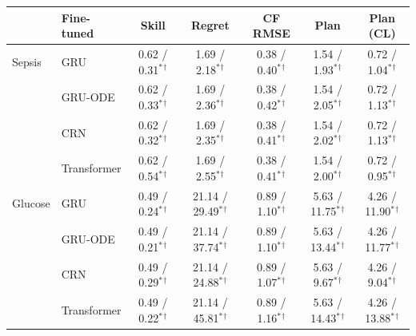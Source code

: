 \begin{tabular}{llccccc}
\toprule
 & Fine-tuned & Skill & Regret & CF RMSE & Plan & Plan (CL) \\
\midrule
Sepsis & GRU & 0.62 / 0.31$^{*}$$^{\dagger}$ & 1.69 / 2.18$^{*}$$^{\dagger}$ & 0.38 / 0.40$^{*}$$^{\dagger}$ & 1.54 / 1.93$^{*}$$^{\dagger}$ & 0.72 / 1.04$^{*}$$^{\dagger}$ \\
 & GRU-ODE & 0.62 / 0.33$^{*}$$^{\dagger}$ & 1.69 / 2.36$^{*}$$^{\dagger}$ & 0.38 / 0.42$^{*}$$^{\dagger}$ & 1.54 / 2.05$^{*}$$^{\dagger}$ & 0.72 / 1.13$^{*}$$^{\dagger}$ \\
 & CRN & 0.62 / 0.32$^{*}$$^{\dagger}$ & 1.69 / 2.35$^{*}$$^{\dagger}$ & 0.38 / 0.41$^{*}$$^{\dagger}$ & 1.54 / 2.02$^{*}$$^{\dagger}$ & 0.72 / 1.13$^{*}$$^{\dagger}$ \\
 & Transformer & 0.62 / 0.54$^{*}$$^{\dagger}$ & 1.69 / 2.55$^{*}$$^{\dagger}$ & 0.38 / 0.41$^{*}$$^{\dagger}$ & 1.54 / 2.00$^{*}$$^{\dagger}$ & 0.72 / 0.95$^{*}$$^{\dagger}$ \\
\midrule
Glucose & GRU & 0.49 / 0.24$^{*}$$^{\dagger}$ & 21.14 / 29.49$^{*}$$^{\dagger}$ & 0.89 / 1.10$^{*}$$^{\dagger}$ & 5.63 / 11.75$^{*}$$^{\dagger}$ & 4.26 / 11.90$^{*}$$^{\dagger}$ \\
 & GRU-ODE & 0.49 / 0.21$^{*}$$^{\dagger}$ & 21.14 / 37.74$^{*}$$^{\dagger}$ & 0.89 / 1.10$^{*}$$^{\dagger}$ & 5.63 / 13.44$^{*}$$^{\dagger}$ & 4.26 / 11.77$^{*}$$^{\dagger}$ \\
 & CRN & 0.49 / 0.29$^{*}$$^{\dagger}$ & 21.14 / 24.88$^{*}$$^{\dagger}$ & 0.89 / 1.07$^{*}$$^{\dagger}$ & 5.63 / 9.67$^{*}$$^{\dagger}$ & 4.26 / 9.04$^{*}$$^{\dagger}$ \\
 & Transformer & 0.49 / 0.22$^{*}$$^{\dagger}$ & 21.14 / 45.81$^{*}$$^{\dagger}$ & 0.89 / 1.16$^{*}$$^{\dagger}$ & 5.63 / 14.43$^{*}$$^{\dagger}$ & 4.26 / 13.88$^{*}$$^{\dagger}$ \\
\bottomrule
\end{tabular}
